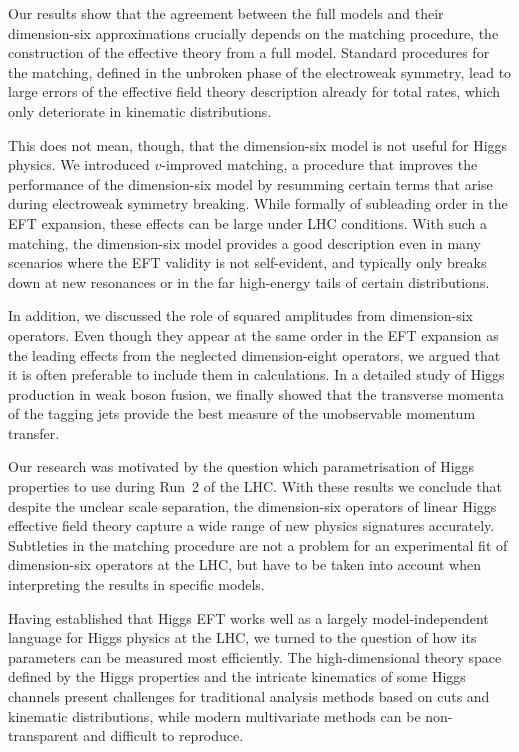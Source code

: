 Our results show that the agreement between the full models and their
dimension-six approximations crucially depends on the matching
procedure, \ie the construction of the effective theory from a full
model. Standard procedures for the matching, defined in the unbroken
phase of the electroweak symmetry, lead to large errors of the
effective field theory description already for total rates, which only
deteriorate in kinematic distributions.

This does not mean, though, that the dimension-six model is not useful
for Higgs physics. We introduced $v$-improved matching, a procedure
that improves the performance of the dimension-six model by resumming
certain terms that arise during electroweak symmetry breaking. While
formally of subleading order in the EFT expansion, these effects can
be large under LHC conditions. With such a matching, the dimension-six
model provides a good description even in many scenarios where the EFT
validity is not self-evident, and typically only breaks down at new
resonances or in the far high-energy tails of certain distributions.

In addition, we discussed the role of squared amplitudes from
dimension-six operators. Even though they appear at the same order in
the EFT expansion as the leading effects from the neglected
dimension-eight operators, we argued that it is often preferable to
include them in calculations. In a detailed study of Higgs production
in weak boson fusion, we finally showed that the transverse momenta of
the tagging jets provide the best measure of the unobservable momentum
transfer.

Our research was motivated by the question which parametrisation of
Higgs properties to use during Run~2 of the LHC. With these results we
conclude that despite the unclear scale separation, the dimension-six
operators of linear Higgs effective field theory capture a wide range
of new physics signatures accurately. Subtleties in the matching
procedure are not a problem for an experimental fit of dimension-six
operators at the LHC, but have to be taken into account when
interpreting the results in specific models.

\newparagraph
%
Having established that Higgs EFT works well as a largely
model-independent language for Higgs physics at the LHC, we turned to
the question of how its parameters can be measured most efficiently. The
high-dimensional theory space defined by the Higgs properties and the
intricate kinematics of some Higgs channels present challenges for
traditional analysis methods based on cuts and kinematic
distributions, while modern multivariate methods can be
non-transparent and difficult to reproduce.

